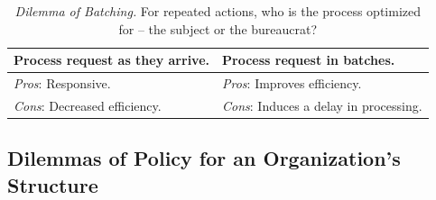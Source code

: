 

\begin{center}
\begin{table}[H] %
\begin{tabular}{ | m{\dilemmatablewidth}| m{\dilemmatablewidth} | } 
  \hline
  \textbf{Process request as they arrive.} &
  \textbf{Process request in batches.} \\
  \hline
  \textit{Pros}: Responsive. & 
  \textit{Pros}: Improves efficiency. \\
  \hline
  \textit{Cons}: Decreased efficiency. & 
  \textit{Cons}: Induces a delay in processing. \\
  \hline
\end{tabular}
\caption{
\textit{Dilemma of Batching.}
For repeated actions, who is the process optimized for -- the subject or the bureaucrat?
}
\label{table:dilemma-personal-batching-requests}
\end{table}
\end{center}


\subsection*{Dilemmas of Policy for an Organization's Structure\label{sec:org-dilemma}}


